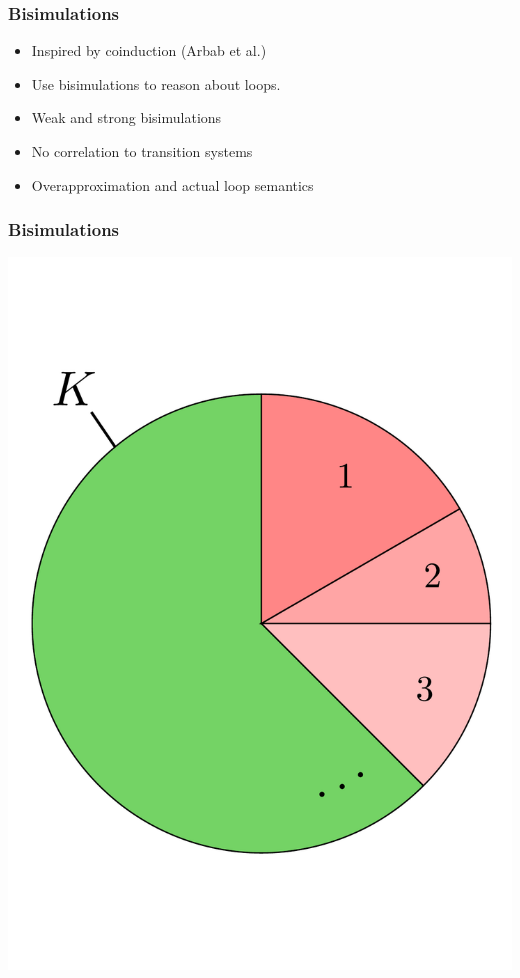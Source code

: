 \begin{frame}
	\frametitle{Bisimulations}
	\begin{itemize}[<+->]
		\itemspacing{20pt}
		\item Inspired by coinduction (Arbab et al.)
		\item Use bisimulations to reason about loops.
    \item Weak and strong bisimulations
    \item No correlation to transition systems
    \item Overapproximation and actual loop semantics
	\end{itemize}
\end{frame}

\begin{frame}
	\frametitle{Bisimulations}
	\begin{center}
		\includegraphics[height=\textheight]{semantics/img/weak_bisimulation.pdf}
	\end{center}
\end{frame}


